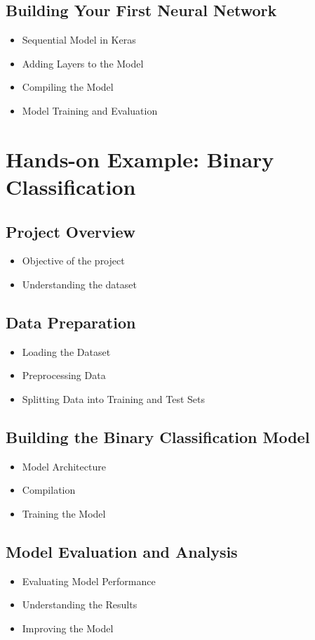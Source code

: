 \documentclass[a4paper,12pt]{book}
\begin{document}
\section{Building Your First Neural Network}
\begin{itemize}
    \item Sequential Model in Keras
    \item Adding Layers to the Model
    \item Compiling the Model
    \item Model Training and Evaluation
\end{itemize}

\chapter{Hands-on Example: Binary Classification}

\section{Project Overview}
\begin{itemize}
    \item Objective of the project
    \item Understanding the dataset
\end{itemize}

\section{Data Preparation}
\begin{itemize}
    \item Loading the Dataset
    \item Preprocessing Data
    \item Splitting Data into Training and Test Sets
\end{itemize}

\section{Building the Binary Classification Model}
\begin{itemize}
    \item Model Architecture
    \item Compilation
    \item Training the Model
\end{itemize}

\section{Model Evaluation and Analysis}
\begin{itemize}
    \item Evaluating Model Performance
    \item Understanding the Results
    \item Improving the Model
\end{itemize}
\end{document}
